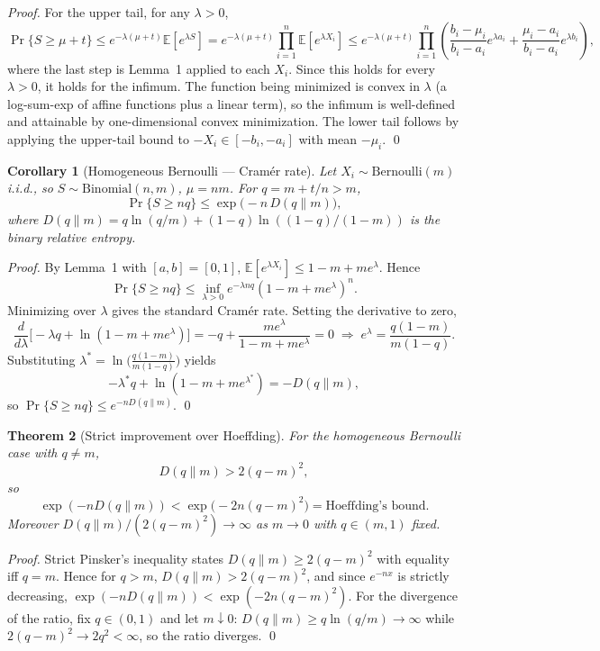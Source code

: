 \documentclass[11pt]{article}
\newtheorem{theorem}{Theorem}[section]
\newtheorem{corollary}[theorem]{Corollary}
\begin{document}
\begin{proof}
For the upper tail, for any $\lambda>0$,
\[
\Pr\{S\ge\mu+t\}\le e^{-\lambda(\mu+t)}\mathbb{E}[e^{\lambda S}]
= e^{-\lambda(\mu+t)}\prod_{i=1}^n\mathbb{E}[e^{\lambda X_i}]
\le e^{-\lambda(\mu+t)}\prod_{i=1}^n
\left(\frac{b_i-\mu_i}{b_i-a_i}e^{\lambda a_i}
+\frac{\mu_i-a_i}{b_i-a_i}e^{\lambda b_i}\right),
\]
where the last step is Lemma~1 applied to each $X_i$. Since this holds for every $\lambda>0$, it holds for the infimum. The function being minimized is convex in $\lambda$ (a log-sum-exp of affine functions plus a linear term), so the infimum is well-defined and attainable by one-dimensional convex minimization. The lower tail follows by applying the upper-tail bound to $-X_i\in[-b_i,-a_i]$ with mean $-\mu_i$. \qed
\end{proof}

\begin{corollary}[Homogeneous Bernoulli --- Cram\'er rate]
Let $X_i\sim\mathrm{Bernoulli}(m)$ i.i.d., so $S\sim\mathrm{Binomial}(n,m)$, $\mu=nm$. For $q=m+t/n>m$,
\[
\Pr\{S\ge nq\}\le \exp\!\big(-n\,D(q\|m)\big),
\]
where $D(q\|m)=q\ln(q/m)+(1-q)\ln((1-q)/(1-m))$ is the binary relative entropy.
\end{corollary}

\begin{proof}
By Lemma~1 with $[a,b]=[0,1]$, $\mathbb{E}[e^{\lambda X_i}]\le1-m+me^\lambda$. Hence
\[
\Pr\{S\ge nq\}\le \inf_{\lambda>0}e^{-\lambda nq}(1-m+me^\lambda)^n.
\]
Minimizing over $\lambda$ gives the standard Cram\'er rate. Setting the derivative to zero,
\[
\frac{d}{d\lambda}\big[-\lambda q+\ln(1-m+me^\lambda)\big]
= -q+\frac{m e^\lambda}{1-m+m e^\lambda}=0
\;\Longrightarrow\;
e^\lambda=\frac{q(1-m)}{m(1-q)}.
\]
Substituting $\lambda^*=\ln\big(\frac{q(1-m)}{m(1-q)}\big)$ yields
\[
-\lambda^*q+\ln(1-m+me^{\lambda^*})=-D(q\|m),
\]
so $\Pr\{S\ge nq\}\le e^{-nD(q\|m)}$. \qed
\end{proof}

\begin{theorem}[Strict improvement over Hoeffding]
For the homogeneous Bernoulli case with $q\neq m$,
\[
D(q\|m)>2(q-m)^2,
\]
so
\[
\exp(-nD(q\|m))<\exp\!\big(-2n(q-m)^2\big)
=\text{Hoeffding's bound}.
\]
Moreover $D(q\|m)/(2(q-m)^2)\to\infty$ as $m\to0$ with $q\in(m,1)$ fixed.
\end{theorem}

\begin{proof}
Strict Pinsker's inequality states $D(q\|m)\ge 2(q-m)^2$ with equality iff $q=m$. Hence for $q>m$, $D(q\|m)>2(q-m)^2$, and since $e^{-nx}$ is strictly decreasing, $\exp(-nD(q\|m))<\exp(-2n(q-m)^2)$. For the divergence of the ratio, fix $q\in(0,1)$ and let $m\downarrow0$: $D(q\|m)\ge q\ln(q/m)\to\infty$ while $2(q-m)^2\to2q^2<\infty$, so the ratio diverges. \qed
\end{proof}
\end{document}
